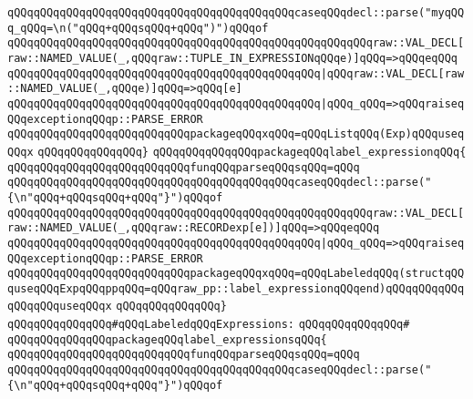 \verb|qQQqqQQqqQQqqQQqqQQqqQQqqQQqqQQqqQQqqQQqqQQqcaseqQQqdecl::parse("myqQQq_qQQq=\n("qQQq+qQQqsqQQq+qQQq")")qQQqof|\newline
\verb|qQQqqQQqqQQqqQQqqQQqqQQqqQQqqQQqqQQqqQQqqQQqqQQqqQQqqQQqraw::VAL_DECL[raw::NAMED_VALUE(_,qQQqraw::TUPLE_IN_EXPRESSIONqQQqe)]qQQq=>qQQqeqQQq|\newline
\verb|qQQqqQQqqQQqqQQqqQQqqQQqqQQqqQQqqQQqqQQqqQQqqQQq|\verb#|qQQqraw::VAL_DECL[raw::NAMED_VALUE(_,qQQqe)]qQQq=>qQQq[e]#\newline
\verb|qQQqqQQqqQQqqQQqqQQqqQQqqQQqqQQqqQQqqQQqqQQqqQQq|\verb#|qQQq_qQQq=>qQQqraiseqQQqexceptionqQQqp::PARSE_ERROR#\newline
\verb|qQQqqQQqqQQqqQQqqQQqqQQqqQQqpackageqQQqxqQQq=qQQqListqQQq(Exp)qQQquseqQQqx|\newline
\verb|qQQqqQQqqQQqqQQq}|\newline
\newline
\verb|qQQqqQQqqQQqqQQqpackageqQQqlabel_expressionqQQq{|\newline
\newline
\verb|qQQqqQQqqQQqqQQqqQQqqQQqqQQqfunqQQqparseqQQqsqQQq=qQQq|\newline
\verb|qQQqqQQqqQQqqQQqqQQqqQQqqQQqqQQqqQQqqQQqqQQqcaseqQQqdecl::parse("{\n"qQQq+qQQqsqQQq+qQQq"}")qQQqof|\newline
\verb|qQQqqQQqqQQqqQQqqQQqqQQqqQQqqQQqqQQqqQQqqQQqqQQqqQQqqQQqraw::VAL_DECL[raw::NAMED_VALUE(_,qQQqraw::RECORDexp[e])]qQQq=>qQQqeqQQq|\newline
\verb|qQQqqQQqqQQqqQQqqQQqqQQqqQQqqQQqqQQqqQQqqQQqqQQq|\verb#|qQQq_qQQq=>qQQqraiseqQQqexceptionqQQqp::PARSE_ERROR#\newline
\verb|qQQqqQQqqQQqqQQqqQQqqQQqqQQqpackageqQQqxqQQq=qQQqLabeledqQQq(structqQQquseqQQqExpqQQqppqQQq=qQQqraw_pp::label_expressionqQQqend)qQQqqQQqqQQqqQQqqQQquseqQQqx|\newline
\verb|qQQqqQQqqQQqqQQq}|\newline
\newline
\verb|qQQqqQQqqQQqqQQq#qQQqLabeledqQQqExpressions:|\newline
\verb|qQQqqQQqqQQqqQQq#|\newline
\verb|qQQqqQQqqQQqqQQqpackageqQQqlabel_expressionsqQQq{|\newline
\newline
\verb|qQQqqQQqqQQqqQQqqQQqqQQqqQQqfunqQQqparseqQQqsqQQq=qQQq|\newline
\verb|qQQqqQQqqQQqqQQqqQQqqQQqqQQqqQQqqQQqqQQqqQQqcaseqQQqdecl::parse("{\n"qQQq+qQQqsqQQq+qQQq"}")qQQqof|\newline
